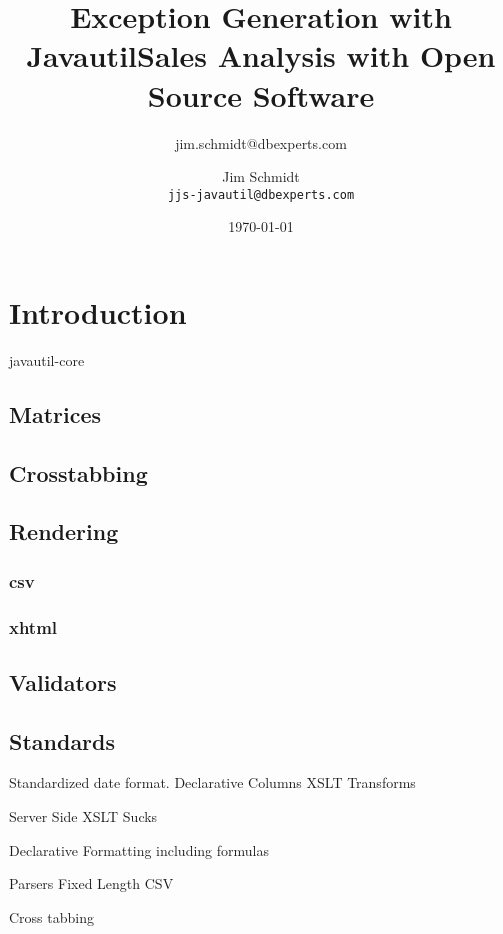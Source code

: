 \documentclass[a4paper,10pt]{book}
\title{Exception Generation with Javautil}
\author{jim.schmidt@dbexperts.com}
\begin{document}
\title{Sales Analysis with Open Source Software}
\author{Jim Schmidt\\
  \texttt{jjs-javautil@dbexperts.com}}
\date{\today}
\maketitle
\tableofcontents
\chapter{Introduction}
javautil-core



\section{Matrices}

\section{Crosstabbing}

\section{Rendering}
  \subsection{csv}
  \subsection{xhtml}

\section{Validators}

\section{Standards}
Standardized date format.
Declarative Columns
XSLT Transforms

Server Side XSLT Sucks

Declarative Formatting including formulas

Parsers Fixed Length
        CSV

Cross tabbing
\end{document}
